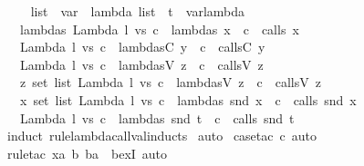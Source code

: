 %
\begin{isabellebody}%
\def\isabellecontext{CPSUtils}%
%
\isamarkupfalse%
\ \isanewline
\ \ \ list{}\ {\isacharcolon}{\isacharcolon}\ {\isachardoublequoteopen}{\isacharparenleft}var\ {\isasymtimes}\ lambda{\isacharparenright}\ list{\isachardoublequoteclose}\ \ t\ {\isacharcolon}{\isacharcolon}\ {\isachardoublequoteopen}var{\isasymtimes}lambda{\isachardoublequoteclose}\isanewline
\ \ \ lambdas{}{\isacharcolon}\ {\isachardoublequoteopen}Lambda\ l\ vs\ c\ {\isasymin}\ lambdas\ x\ {\isasymLongrightarrow}\ c\ {\isasymin}\ calls\ x{\isachardoublequoteclose}\isanewline
\ \ \ {\isachardoublequoteopen}Lambda\ l\ vs\ c\ {\isasymin}\ lambdasC\ y\ {\isasymLongrightarrow}\ c\ {\isasymin}\ callsC\ y{\isachardoublequoteclose}\isanewline
\ \ \ {\isachardoublequoteopen}Lambda\ l\ vs\ c\ {\isasymin}\ lambdasV\ z\ {\isasymLongrightarrow}\ c\ {\isasymin}\ callsV\ z{\isachardoublequoteclose}\isanewline
\ \ \ {\isachardoublequoteopen}{\isasymforall}z{\isasymin}\ set\ list{\isachardot}\ Lambda\ l\ vs\ c\ {\isasymin}\ lambdasV\ z\ {\isasymlongrightarrow}\ c\ {\isasymin}\ callsV\ z{\isachardoublequoteclose}\isanewline
\ \ \ {\isachardoublequoteopen}{\isasymforall}x{\isasymin}\ set\ {\isacharparenleft}list{}{\isachardot}\ Lambda\ l\ vs\ c\ {\isasymin}\ lambdas\ {\isacharparenleft}snd\ x{\isacharparenright}\ {\isasymlongrightarrow}\ c\ {\isasymin}\ calls\ {\isacharparenleft}snd\ x{\isacharparenright}{\isachardoublequoteclose}\isanewline
\ \ \ {\isachardoublequoteopen}Lambda\ l\ vs\ c\ {\isasymin}\ lambdas\ {\isacharparenleft}snd\ t{\isacharparenright}\ {\isasymLongrightarrow}\ c\ {\isasymin}\ calls\ {\isacharparenleft}snd\ t{\isacharparenright}{\isachardoublequoteclose}\isanewline
%
\isadelimproof
%
\endisadelimproof
%
\isatagproof
{}\isamarkupfalse%
\ {\isacharparenleft}induct\ rule{\isacharcolon}lambda{\isacharunderscore}call{\isacharunderscore}val{\isachardot}inducts{\isacharparenright}\isanewline
{}\isamarkupfalse%
\ auto\isanewline
{}\isamarkupfalse%
\ {\isacharparenleft}case{\isacharunderscore}tac\ c{\isacharcomma}\ auto{\isacharparenright}{\isacharbrackleft}{}{\isacharbrackright}\isanewline
{}\isamarkupfalse%
\ {\isacharparenleft}rule{\isacharunderscore}tac\ x{\isacharequal}{\isachardoublequoteopen}{\isacharparenleft}{\isacharparenleft}a{\isacharcomma}\ b{\isacharparenright}{\isacharcomma}\ ba{\isacharparenright}{\isachardoublequoteclose}\ \ bexI{\isacharcomma}\ auto{\isacharparenright}\isanewline
{}\isamarkupfalse%
%
\endisatagproof
{\isafoldproof}%
\end{isabellebody}%
